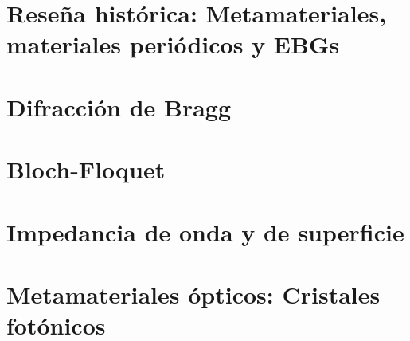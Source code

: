 
\section{Reseña histórica: Metamateriales, materiales periódicos y EBGs}
\label{sec_resenia_metamateriales}
\lipsum
\section{Difracción de Bragg}
\label{sec_bragg}
\lipsum
\section{Bloch-Floquet}
\label{sec_bloch}
\lipsum
\section{Impedancia de onda y de superficie}
\label{sec_imp_superficie}
\lipsum


\section{Metamateriales ópticos: Cristales fotónicos}
\label{sec_cristales_fotonicos}
\lipsum
